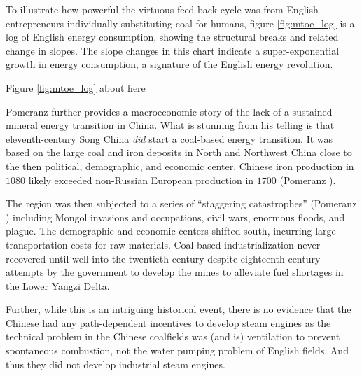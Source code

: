 \documentclass[12pt]{article}
\numberwithin{equation}{section}
\begin{document}
		To illustrate how powerful the virtuous feed-back cycle was from English entrepreneurs individually substituting coal for humans, figure \ref{fig:mtoe_log} is a log of English energy consumption, showing the structural breaks and related change in slopes. The slope changes in this chart indicate a super-exponential growth in energy consumption, a signature of the English energy revolution.

\begin{center}
Figure \ref{fig:mtoe_log} about here
\end{center}
			
				
		Pomeranz further provides a macroeconomic story of the lack of a sustained mineral energy transition in China. What is stunning from his telling is that eleventh-century Song China \textit{did} start a coal-based energy transition. It was based on the large coal and iron deposits in North and Northwest China close to the then political, demographic, and economic center. Chinese iron production in $1080$ likely exceeded non-Russian European production in $1700$ (Pomeranz \citeyear[p.~62]{pomeranz_great_2001}).
		
		The region was then subjected to a series of ``staggering catastrophes'' (Pomeranz \citeyear[p.~62]{pomeranz_great_2001}) including Mongol invasions and occupations, civil wars, enormous floods, and plague. The demographic and economic centers shifted south, incurring large transportation costs for raw materials. Coal-based industrialization never recovered until well into the twentieth century despite eighteenth century attempts by the government to develop the mines to alleviate fuel shortages in the Lower Yangzi Delta.
		
		Further, while this is an intriguing historical event, there is no evidence that the Chinese had any path-dependent incentives to develop steam engines as the technical problem in the Chinese coalfields was (and is) ventilation to prevent spontaneous combustion, not the water pumping problem of English fields. And thus they did not develop industrial steam engines.
		
\end{document}
